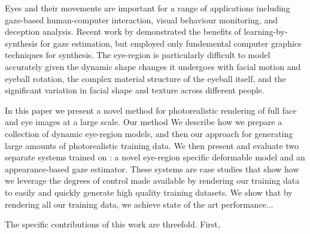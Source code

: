 Eyes and their movements are important for a range of applications including gaze-based human-computer interaction, visual behaviour monitoring, and deception analysis.  Recent work by \citet{sugano2014learning} demonstrated the benefits of learning-by-synthesis for gaze estimation, but employed only fundemental computer graphics techniques for synthesis.
The eye-region is particularly difficult to model accurately given the dynamic shape changes it undergoes with facial motion and eyeball rotation, the complex material structure of the eyeball itself, and the significant variation in facial shape and texture across different people.





In this paper we present a novel method for photorealistic rendering of full face and eye images at a large scale.
Our method 
We describe how we prepare a collection of dynamic eye-region models, and then our approach for generating large amounts of photorealistic training data.
We then present and evaluate two separate systems trained on \dataset: a novel eye-region specific deformable model and an appearance-based gaze estimator.
These systems are case studies that show how we leverage the degrees of control made available by rendering our training data to easily and quickly generate high quality training datasets.
We show that by rendering all our training data, we achieve state of the art performance...

The specific contributions of this work are threefold. First, 

